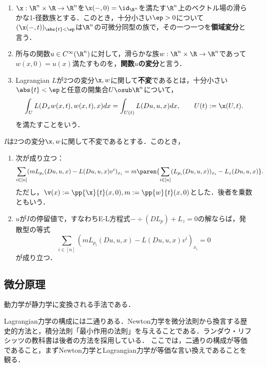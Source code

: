 \documentclass[uplatex,dvipdfmx]{jsreport}
\begin{document}
\begin{definition}\mbox{}
    \begin{enumerate}
        \item $\x:\R^n\times\R\to\R^n$を$\x(-,0)=\id_{\R^n}$を満たす$\R^n$上のベクトル場の滑らかな1-径数族とする．このとき，十分小さい$\ep>0$について$(\x(-,t))_{\abs{t}<\ep}$は$\R^n$の可微分同型の族で，その一つ一つを\textbf{領域変分}と言う．
        \item 所与の関数$u\in C^\infty(\R^n)$に対して，滑らかな族$w:\R^n\times\R\to\R^n$であって$w(x,0)=u(x)$満たすものを，\textbf{関数$u$の変分}と言う．
        \item Lagrangian $L$が2つの変分$\x,w$に関して\textbf{不変}であるとは，十分小さい$\abs{t}<\ep$と任意の開集合$U\osub\R^n$について，
        \[\int_U L(D_xw(x,t),w(x,t),x)dx=\int_{U(t)}L(Du,u,x)dx,\qquad U(t):=\x(U,t).\]
        を満たすことをいう．
    \end{enumerate}
\end{definition}

\begin{theorem}
    $I$は2つの変分$\x,w$に関して不変であるとする．このとき，
    \begin{enumerate}
        \item 次が成り立つ：
        \[\sum_{i\in[n]}(mL_{p_i}(Du,u,x)-L(Du,u,x)v^i)_{x_i}=m\paren{\sum_{i\in[n]}(L_{p_i}(Du,u,x))_{x_i}-L_z(Du,u,x)}.\]
        ただし，$\v(x):=\pp{\x}{t}(x,0),m:=\pp{w}{t}(x,0)$とした．後者を乗数ともいう．
        \item $u$が$I$の停留値で，すなわちE-L方程式$-\div(DL_p)+L_z=0$の解ならば，発散型の等式
        \[\sum_{i\in[n]}(mL_{p_i}(Du,u,x)-L(Du,u,x)v^i)_{x_i}=0\]
        が成り立つ．
    \end{enumerate}
\end{theorem}

\subsection{微分原理}

\begin{tcolorbox}[colframe=ForestGreen, colback=ForestGreen!10!white,breakable,colbacktitle=ForestGreen!40!white,coltitle=black,fonttitle=\bfseries\sffamily,
title=仮想仕事とd'Alembertの法則によるLagrangeの方程式の導出]
    動力学が静力学に変換される手法である．
\end{tcolorbox}

\begin{screen}
    Lagrangian力学の構成には二通りある．Newton力学を微分法則から換言する歴史的方法と，積分法則「最小作用の法則」を与えることである．ランダウ・リフシッツの教科書は後者の方法を採用している．
    ここでは，二通りの構成が等価であること，まずNewton力学とLagrangian力学が等価な言い換えであることを観る．
\end{screen}
\end{document}
